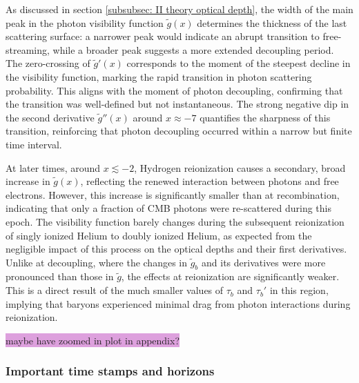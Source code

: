 \documentclass{aa}
\numberwithin{equation}{section}
\numberwithin{table}{section}
\numberwithin{figure}{section}
\begin{document}
As discussed in section \ref{subsubsec: II theory optical depth}, the width of the main peak in the photon visibility function $\tilde{g}(x)$ determines the thickness of the last scattering surface: a narrower peak would indicate an abrupt transition to free-streaming, while a broader peak suggests a more extended decoupling period. The zero-crossing of $\tilde{g}'(x)$ corresponds to the moment of the steepest decline in the visibility function, marking the rapid transition in photon scattering probability. This aligns with the moment of photon decoupling, confirming that the transition was well-defined but not instantaneous. The strong negative dip in the second derivative $\tilde{g}''(x)$ around $x \approx -7$ quantifies the sharpness of this transition, reinforcing that photon decoupling occurred within a narrow but finite time interval.

At later times, around $x \lesssim -2$, Hydrogen reionization causes a secondary, broad increase in $\tilde{g}(x)$, reflecting the renewed interaction between photons and free electrons. However, this increase is significantly smaller than at recombination, indicating that only a fraction of CMB photons were re-scattered during this epoch. The visibility function barely changes during the subsequent reionization of singly ionized Helium to doubly ionized Helium, as expected from the negligible impact of this process on the optical depths and their first derivatives. Unlike at decoupling, where the changes in $\tilde{g}_b$ and its derivatives were more pronounced than those in $\tilde{g}$, the effects at reionization are significantly weaker. This is a direct result of the much smaller values of $\tau_b$ and $\tau_b'$ in this region, implying that baryons experienced minimal drag from photon interactions during reionization.


\colorbox{Plum}{maybe have zoomed in plot in appendix?}



\subsubsection{Important time stamps and horizons}
\end{document}
